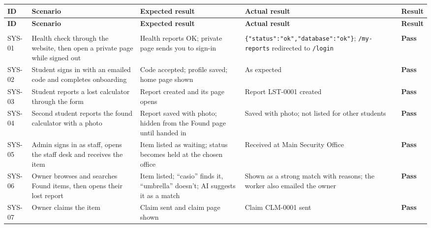 {\small\setlength{\tabcolsep}{5pt}
\begin{longtable}{@{}>{\raggedright\arraybackslash}p{}>{\raggedright\arraybackslash}p{}>{\raggedright\arraybackslash}p{}>{\raggedright\arraybackslash}p{}>{\raggedright\arraybackslash}p{}@{}}
\toprule
\textbf{ID} & \textbf{Scenario} & \textbf{Expected result} & \textbf{Actual result} & \textbf{Result} \\
\midrule
\endfirsthead
\toprule
\textbf{ID} & \textbf{Scenario} & \textbf{Expected result} & \textbf{Actual result} & \textbf{Result} \\
\midrule
\endhead
\midrule\multicolumn{5}{r}{\scriptsize\itshape\color{soft}continued on the next page}\\
\endfoot
\bottomrule
\endlastfoot
SYS-01 & Health check through the website, then open a private page while signed out & Health reports OK; private page sends you to sign-in & \texttt{\{"status":\allowbreak{}"ok",\allowbreak{}"database":\allowbreak{}"ok"\}}; \texttt{/\allowbreak{}my-\allowbreak{}reports} redirected to \texttt{/\allowbreak{}login} & \textcolor{found}{\textbf{Pass}} \\
SYS-02 & Student signs in with an emailed code and completes onboarding & Code accepted; profile saved; home page shown & As expected & \textcolor{found}{\textbf{Pass}} \\
SYS-03 & Student reports a lost calculator through the form & Report created and its page opens & Report LST-0001 created & \textcolor{found}{\textbf{Pass}} \\
SYS-04 & Second student reports the found calculator with a photo & Report saved with photo; hidden from the Found page until handed in & Saved with photo; not listed for other students & \textcolor{found}{\textbf{Pass}} \\
SYS-05 & Admin signs in as staff, opens the staff desk and receives the item & Item listed as waiting; status becomes held at the chosen office & Received at Main Security Office & \textcolor{found}{\textbf{Pass}} \\
SYS-06 & Owner browses and searches Found items, then opens their lost report & Item listed; “casio” finds it, “umbrella” doesn’t; AI suggests it as a match & Shown as a strong match with reasons; the worker also emailed the owner & \textcolor{found}{\textbf{Pass}} \\
SYS-07 & Owner claims the item & Claim sent and claim page shown & Claim CLM-0001 sent & \textcolor{found}{\textbf{Pass}} \\

\end{longtable}}

